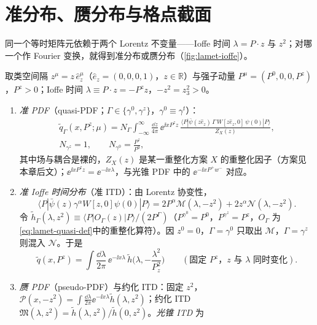 \section{准分布、赝分布与格点截面}\label{sec:lattice-quasi}

同一个等时矩阵元依赖于两个 Lorentz 不变量——Ioffe 时间 $\lambda=P\cdot z$ 与 $z^2$；对哪一个作 Fourier 变换，就得到准分布或赝分布（\cref{fig:lamet-ioffe}）。

\begin{definition}\label{def:lattice-quasi}
取类空间隔 $z^\mu=z\,\hat e_z^\mu$（$\hat e_z=(0,0,0,1)$，$z\in\mathbb R$）与强子动量 $P^\mu=(P^0,0,0,P^z)$，$P^z>0$；Ioffe 时间 $\lambda\equiv P\cdot z=-P^zz$，$-z^2=z_3^2>0$。
\begin{enumerate}[label=(\roman*),leftmargin=2em,itemsep=1pt,topsep=2pt]
\item \emph{准 PDF}（quasi-PDF；$\Gamma\in\{\gamma^0,\gamma^z\}$，$\gamma^0\equiv\gamma^t$）：
\begin{equation}\label{eq:lamet-quasi-def}
\begin{gathered}
\tilde q_\Gamma(x,P^z;\mu)=N_\Gamma\int_{-\infty}^{\infty}\frac{\dd z}{4\pi}\,\ee^{\ii xP^zz}\,\frac{\langle P|\bar\psi(z\hat e_z)\,\Gamma\,W[z\hat e_z,0]\,\psi(0)|P\rangle}{Z_X(z)},\\
N_{\gamma^z}=1,\qquad N_{\gamma^0}=\frac{P^z}{P^0},
\end{gathered}
\end{equation}
其中场与耦合是裸的，$Z_X(z)$ 是某一重整化方案 $X$ 的重整化因子（方案见本章后文）；$\ee^{\ii xP^zz}=\ee^{-\ii x\lambda}$，与光锥 PDF 中的 $\ee^{-\ii xP^+w^-}$ 对应。%
\item \emph{准 Ioffe 时间分布}（准 ITD）：由 Lorentz 协变性，
\[
\langle P|\bar\psi(z)\gamma^\alpha W[z,0]\psi(0)|P\rangle=2P^\alpha\mathcal M(\lambda,-z^2)+2z^\alpha\mathcal N(\lambda,-z^2).
\]
令 $\tilde h_\Gamma(\lambda,z^2)\equiv\langle P|O_\Gamma(z)|P\rangle/(2P^\Gamma)$（$P^{\gamma^0}=P^0$，$P^{\gamma^z}=P^z$，$O_\Gamma$ 为\cref{eq:lamet-quasi-def}中的重整化算符）。因 $z^0=0$，$\Gamma=\gamma^0$ 只取出 $\mathcal M$，$\Gamma=\gamma^z$ 则混入 $\mathcal N$。于是
\begin{equation}\label{eq:lamet-quasi-itd}
\tilde q(x,P^z)=\int\frac{\dd\lambda}{2\pi}\,\ee^{-\ii x\lambda}\,\tilde h\Big(\lambda,-\frac{\lambda^2}{P_z^2}\Big)\qquad(\text{固定 }P^z\text{，}z\text{ 与 }\lambda\text{ 同时变化}).
\end{equation}
\item \emph{赝 PDF}（pseudo-PDF）与约化 ITD：固定 $z^2$，$\mathcal P(x,-z^2)=\int\frac{\dd\lambda}{2\pi}\ee^{-\ii x\lambda}\tilde h(\lambda,z^2)$；约化 ITD $\mathfrak M(\lambda,z^2)=\tilde h(\lambda,z^2)/\tilde h(0,z^2)$。\emph{光锥 ITD} 为

\end{enumerate}
\end{definition}
